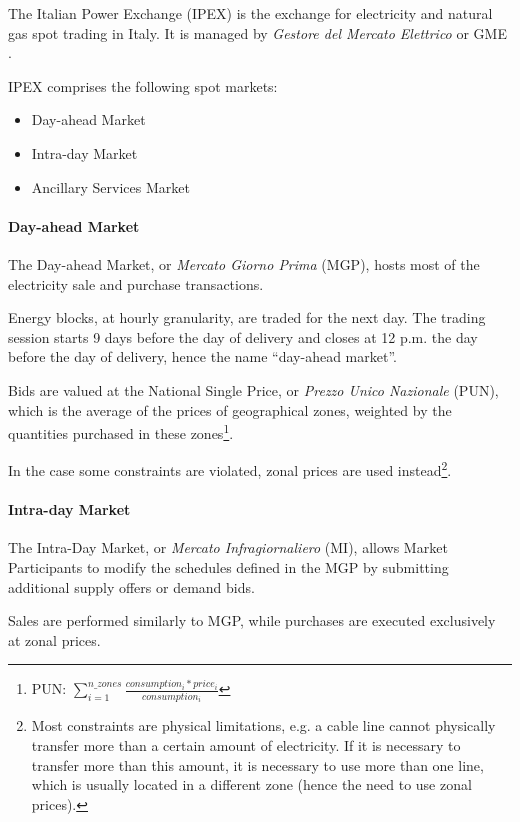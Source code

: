 \label{section:providers:gme}
The Italian Power Exchange (IPEX) is the exchange for electricity and natural gas spot trading in Italy.
It is managed by \textit{Gestore del Mercato Elettrico} or GME \cite{bib:gme:mpe}.

IPEX comprises the following spot markets:
    \begin{itemize}
        \item Day-ahead Market
        \item Intra-day Market
        \item Ancillary Services Market
    \end{itemize}
    
\paragraph{Day-ahead Market}
    The Day-ahead Market, or \textit{Mercato Giorno Prima} (MGP), hosts most of the electricity sale and purchase transactions.
    
    Energy blocks, at hourly granularity, are traded for the next day.
    The trading session starts 9 days before the day of delivery and closes at 12 p.m. the day before the day of delivery, hence the name ``day-ahead market''.
    
    Bids are valued at the National Single Price, or \textit{Prezzo Unico Nazionale} (PUN), which is the average of the prices of geographical zones, weighted by the quantities purchased in these zones\footnote{PUN: $\sum_{i=1}^{n\_zones} \frac{consumption_i * price_i}{consumption_i}$}.
    
    In the case some constraints are violated, zonal prices are used instead\footnote{Most constraints are physical limitations, e.g. a cable line cannot physically transfer more than a certain amount of electricity. If it is necessary to transfer more than this amount, it is necessary to use more than one line, which is usually located in a different zone (hence the need to use zonal prices).}.

\paragraph{Intra-day Market}
    The Intra-Day Market, or \textit{Mercato Infragiornaliero} (MI), allows Market Participants to modify the schedules defined in the MGP by submitting additional supply offers or demand bids.
    
    Sales are performed similarly to MGP, while purchases are executed exclusively at zonal prices.
    
